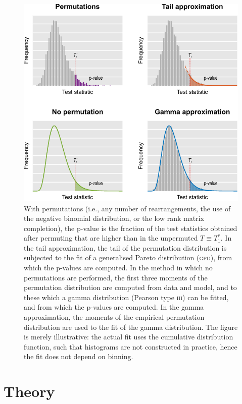 \begin{figure}[!p]
\begin{center}
\includegraphics{figures/curvefits.pdf}
\end{center}
\caption{With permutations (i.e., any number of rearrangements, the use of the negative binomial distribution, or the low rank matrix completion), the p-value is the fraction of the test statistics obtained after permuting that are higher than in the unpermuted $T \equiv T_1^*$. In the tail approximation, the tail of the permutation distribution is subjected to the fit of a generalised Pareto distribution (\textsc{gpd}), from which the p-values are computed. In the method in which no permutations are performed, the first three moments of the permutation distribution are computed from data and model, and to these which a gamma distribution (Pearson type \textsc{iii}) can be fitted, and from which the p-values are computed. In the gamma approximation, the moments of the empirical permutation distribution are used to the fit of the gamma distribution. The figure is merely illustrative: the actual fit uses the cumulative distribution function, such that histograms are not constructed in practice, hence the fit does not depend on binning.}
\label{fig:curvefits}
\end{figure}

\section{Theory}
\label{sec:accel:theory}

